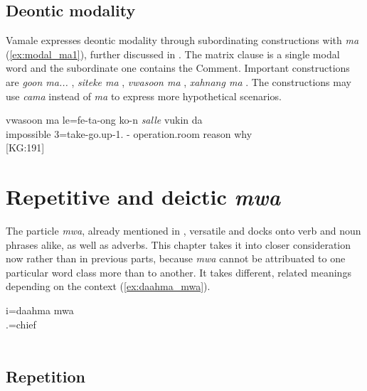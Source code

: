 \subsection{Deontic modality}
Vamale expresses deontic modality through subordinating constructions with \textit{ma}  (\ref{ex:modal_ma1}), further discussed in . The matrix clause is a single modal word and the subordinate one contains the Comment. Important constructions are \textit{goon ma...}  , \textit{siteke ma}  , \textit{vwasoon ma}  , \textit{xahnang ma}  . The constructions may use \textit{cama}  instead of \textit{ma} to express more hypothetical scenarios.

\ea \label{ex:modal_ma1}
\gll vwasoon {ma} le=fe-ta-ong ko-n \textit{salle} vukin da\\
 impossible  3=take-go.up-1. - operation.room reason why\\
\glt {} {[KG:191]}
\z

\section{Repetitive and deictic \textit{mwa}} 
\label{sec:mwa}

The particle \textit{mwa}, already mentioned in , versatile and docks onto verb and noun phrases alike, as well as adverbs. This chapter takes it into closer consideration now rather than in previous parts, because \textit{mwa} cannot be attribuated to one particular word class more than to another. It takes different, related meanings depending on the context (\ref{ex:daahma_mwa}). 

\ea \label{ex:daahma_mwa}
\gll i=daahma mwa\\ 
 .=chief \\
\glt {}\\
\z

\subsection{Repetition}


